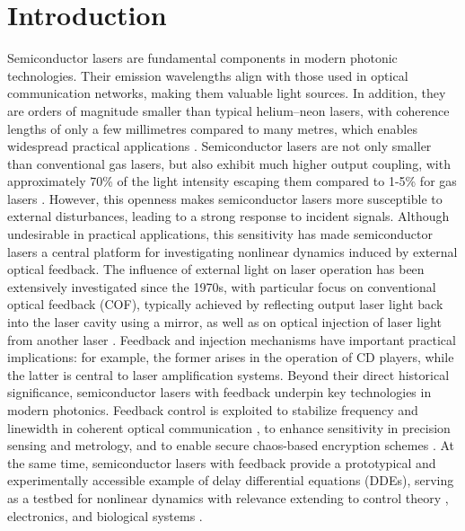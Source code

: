 \section{Introduction}
\label{sec:introduction}
%
Semiconductor lasers are fundamental components in modern photonic technologies.
Their emission wavelengths align with those used in optical communication networks, making them valuable light sources. 
In addition, they are orders of magnitude smaller than typical helium–neon lasers, with coherence lengths of only a few millimetres compared to many metres, which enables widespread practical applications \cite{heiskanen2018photobiomodulation}.
Semiconductor lasers are not only smaller than conventional gas lasers, but also exhibit much higher output coupling, with approximately 70\% of the light intensity escaping them compared to 1-5\% for gas lasers \cite{vantartwijk1995semiconductor}.
However, this openness makes semiconductor lasers more susceptible to external disturbances, leading to a strong response to incident signals.
Although undesirable in practical applications, this sensitivity has made semiconductor lasers a central platform for investigating nonlinear dynamics induced by external optical feedback.
The influence of external light on laser operation has been extensively investigated since the 1970s, with particular focus on conventional optical feedback (COF), typically achieved by reflecting output laser light back into the laser cavity using a mirror, as well as on optical injection of laser light from another laser \cite{weiss1991dynamics}.
Feedback and injection mechanisms have important practical implications: for example, the former arises in the operation of CD players, while the latter is central to laser amplification systems.
Beyond their direct historical significance, semiconductor lasers with feedback underpin key technologies in modern photonics. 
Feedback control is exploited to stabilize frequency and linewidth in coherent optical communication \cite{tkach2003regimes}, to enhance sensitivity in precision sensing and metrology, and to enable secure chaos-based encryption schemes \cite{uchida2008fast}. 
At the same time, semiconductor lasers with feedback provide a prototypical and experimentally accessible example of delay differential equations (DDEs), serving as a testbed for nonlinear dynamics with relevance extending to control theory \cite{stepan1989retarded}, electronics, and biological systems \cite{mackey1977oscillation}.
%
%
